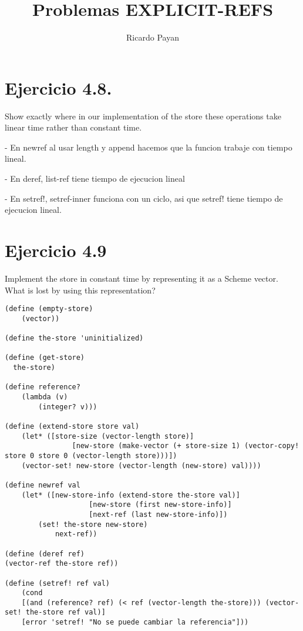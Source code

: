 \documentclass{article}
\title{ Problemas EXPLICIT-REFS }
\author{Ricardo Payan}
\begin{document}
\maketitle

\section*{Ejercicio 4.8.}


Show exactly where in our implementation of the store these operations take linear time rather than constant time.



- En newref al usar length y append hacemos que la funcion trabaje con tiempo lineal.

- En deref, list-ref tiene tiempo de ejecucion lineal

- En setref!, setref-inner funciona con un ciclo, asi que setref! tiene tiempo de ejecucion lineal.


\section*{Ejercicio 4.9}
Implement the store in constant time by representing it as a Scheme vector. What is lost by using this representation?

\begin{lstlisting}
(define (empty-store)
	(vector))

(define the-store 'uninitialized)

(define (get-store)
  the-store)

(define reference?
	(lambda (v)
		(integer? v)))

(define (extend-store store val)
	(let* ([store-size (vector-length store)]
				[new-store (make-vector (+ store-size 1) (vector-copy! store 0 store 0 (vector-length store)))])
	(vector-set! new-store (vector-length (new-store) val))))

(define newref val
	(let* ([new-store-info (extend-store the-store val)]
					[new-store (first new-store-info)]
					[next-ref (last new-store-info)])
		(set! the-store new-store) 
			next-ref))

(define (deref ref)
(vector-ref the-store ref))

(define (setref! ref val)
	(cond
	[(and (reference? ref) (< ref (vector-length the-store))) (vector-set! the-store ref val)]
	[error 'setref! "No se puede cambiar la referencia"]))
\end{lstlisting}
\end{document}
